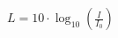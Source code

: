\documentclass[preview]{standalone}
\begin{document}
\begin{align*}
L = 10 \cdot \log_{10}\left(\frac{I}{I_0}\right)
\end{align*}
\end{document}
